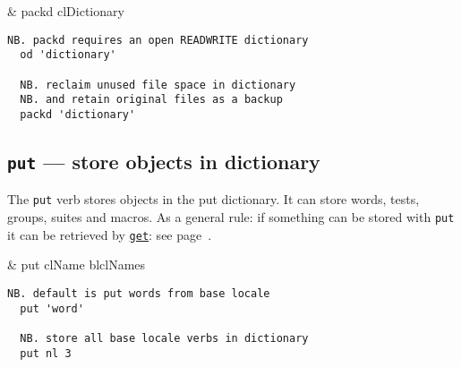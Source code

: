 \begin{wordhead}
\monad & packd clDictionary \\
\end{wordhead}
\begin{lstlisting}[frame=single,framerule=0pt] 
  NB. packd requires an open READWRITE dictionary
  od 'dictionary'   
   
  NB. reclaim unused file space in dictionary
  NB. and retain original files as a backup 
  packd 'dictionary' 
\end{lstlisting}                  


\subsection{\texttt{put} --- store objects in dictionary}\label{ss:put}

The \hypertarget{il:put}{\texttt{put}}
 verb stores objects in the put dictionary.
 It can store words, tests, groups, suites and macros. 
 As a general rule: if something can be stored with \texttt{put} 
 it can be retrieved by \hyperlink{il:get}{\texttt{get}}: see page~\pageref{ss:get}.

\begin{wordhead}
\monad & put clName \argsep blclNames \\
\end{wordhead}
\begin{lstlisting}[frame=single,framerule=0pt] 
  NB. default is put words from base locale 
  put 'word' 
  
  NB. store all base locale verbs in dictionary
  put nl 3
\end{lstlisting} 
  
